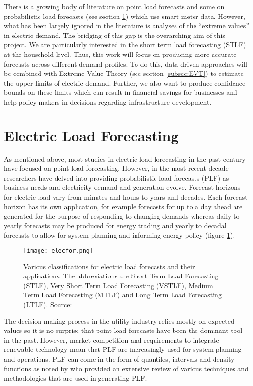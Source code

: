 There is a growing body of literature on point load forecasts and some on probabilistic load forecasts (see section \ref{subsec:litrev}) which use smart meter data. However, what has been largely ignored in the literature is analyses of the ``extreme values''  in electric demand. The bridging of this gap is the overarching aim of this project. We are particularly interested in the short term load forecasting (STLF) at the household level. Thus, this work will focus on producing more accurate forecasts across different demand profiles. To do this, data driven approaches will be combined with Extreme Value Theory (see section \ref{subsec:EVT}) to estimate the upper limits of electric demand. Further, we also want to produce confidence bounds on these limits which can result in financial savings for businesses and help policy makers in decisions regarding infrastructure development.

\section{Electric Load Forecasting} \label{subsec:litrev}

As mentioned above, most studies in electric load forecasting in the past century have focused on point load forecasting. However, in the most recent decade researchers have delved into providing probabilistic load forecasts (PLF) as business needs and electricity demand and generation evolve. Forecast horizons for electric load vary from minutes and hours to years and decades. Each forecast horizon has its own application, for example forecasts for up to a day ahead are generated for the purpose of responding to changing demands whereas daily to yearly forecasts may be produced for energy trading and yearly to decadal forecasts to allow for system planning and informing energy policy (figure \ref{fig:elecfor}).

\begin{figure}
\centering
\texttt{[image: elecfor.png]}
\caption{Various classifications for electric load forecasts and their applications. The abbreviations are Short Term Load Forecasting (STLF), Very Short Term Load Forecasting (VSTLF), Medium Term Load Forecasting (MTLF) and Long Term Load Forecasting (LTLF). Source: \citet{hong16}}
\label{fig:elecfor} 
\end{figure}

The decision making process in the utility industry relies mostly on expected values so it is no surprise that point load forecasts have been the dominant tool in the past. However, market competition and requirements to integrate renewable technology mean that PLF are increasingly used for system planning and operations. PLF can come in the form of quantiles, intervals and density functions as noted by \citet{hong16} who provided an extensive review of various techniques and methodologies that are used in generating PLF. 

